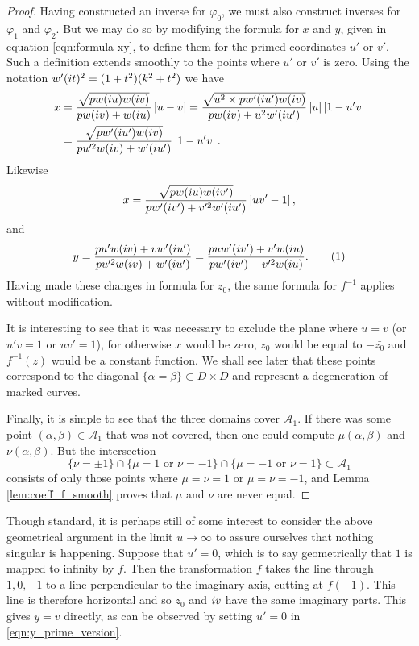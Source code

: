 \begin{lem}
\begin{proof}
Having constructed an inverse for $φ_0$, we must also construct inverses for $φ_1$ and $φ_2$. But we may do so by modifying the formula for $x$ and $y$, given in equation \eqref{eqn:formula xy}, to define them for the primed coordinates $u'$ or $v'$. Such a definition extends smoothly to the points where $u'$ or $v'$ is zero. Using the notation $w'(i t)^2 = (1+t^2)(k^2 + t^2)$ we have
\begin{align*}
x
&= \frac{\sqrt{pw(i u)w(i v)}}{pw(i v) + w(i u)} \left|u-v\right|
= \frac{\sqrt{u^2 \times pw'(i u')w(i v)}}{pw(i v) + u^2 w'(i u')} \left|u\right|\left|1-u'v\right| \\
&= \frac{\sqrt{pw'(i u')w(i v)}}{pu'^2w(i v) + w'(i u')} \left|1-u'v\right|.
\end{align*}
Likewise
\[
x
= \frac{\sqrt{pw(i u)w(i v')}}{pw'(i v') + v'^2w'(i u')} \left|uv'-1\right|,
\]
and
\[
y
= \frac{pu'w(\iu v) + vw'(\iu u')}{pu'^2w(\iu v) + w'(\iu u')}
= \frac{puw'(\iu v') + v'w(\iu u)}{pw'(\iu v') + v'^2w(\iu u)}. \labelthis{eqn:y_prime_version}
\]
Having made these changes in formula for $z_0$, the same formula for $f^{-1}$ applies without modification.

It is interesting to see that it was necessary to exclude the plane where $u=v$ (or $u'v=1$ or $uv'=1$), for otherwise $x$ would be zero, $z_0$ would be equal to $-\bar{z_0}$ and $f^{-1}(z)$ would be a constant function. We shall see later that these points correspond to the diagonal $\{α=β\} \subset D\times D$ and represent a degeneration of marked curves.

Finally, it is simple to see that the three domains cover $\mathcal{A}_1$. If there was some point $(α,β) \in \mathcal{A}_1$ that was not covered, then one could compute $μ(α,β)$ and $ν(α,β)$. But the intersection
\[
\{ν = \pm 1\}
\cap \{μ = 1 \text{ or } ν = -1 \}
\cap \{μ = -1 \text{ or } ν = 1 \} \subset \mathcal{A}_1
\]
consists of only those points where $μ=ν=1$ or $μ=ν=-1$, and Lemma \ref{lem:coeff_f_smooth} proves that $μ$ and $ν$ are never equal.
\end{proof}
\end{lem}

Though standard, it is perhaps still of some interest to consider the above geometrical argument in the limit $u\to\infty$ to assure ourselves that nothing singular is happening. Suppose that $u' = 0$, which is to say geometrically that $1$ is mapped to infinity by $f$. Then the transformation $f$ takes the line through $1,0,-1$ to a line perpendicular to the imaginary axis, cutting at $f(-1)$. This line is therefore horizontal and so $z_0$ and $i v$ have the same imaginary parts. This gives $y=v$ directly, as can be observed by setting $u'=0$ in \eqref{eqn:y_prime_version}.


